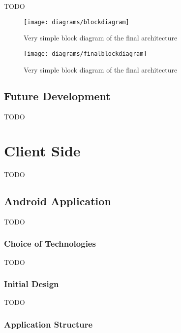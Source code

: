 {TODO}

\begin{figure}[h!]
    \centering
    \texttt{[image: diagrams/blockdiagram]}
    \caption{Very simple block diagram of the final architecture}
    \label{fig:final_block_diagram_image}
\end{figure} 
\noindent

\begin{figure}[h!]
    \centering
    \texttt{[image: diagrams/finalblockdiagram]}
    \caption{Very simple block diagram of the final architecture}
    \label{fig:final_block_diagram_image}
\end{figure} 
\noindent


\subsection{Future Development}

{TODO}





\section{Client Side}

{TODO}

\subsection{Android Application}

{TODO}

\subsubsection*{Choice of Technologies}

{TODO}

\subsubsection*{Initial Design}

{TODO}

\subsubsection*{Application Structure}

